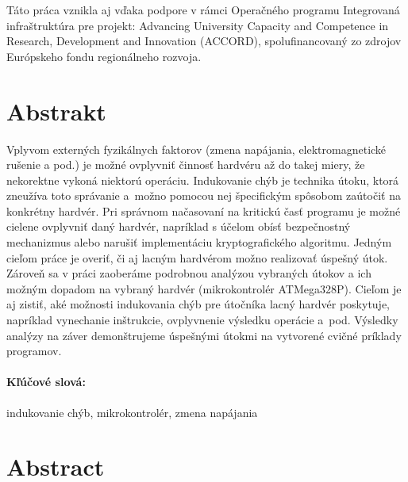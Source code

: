 \documentclass[12pt, twoside]{book}
\begin{document}
Táto práca vznikla aj vďaka podpore v rámci Operačného programu Integrovaná infraštruktúra pre projekt: Advancing University Capacity and Competence in Research, Development and Innovation (ACCORD), spolufinancovaný zo zdrojov Európskeho fondu regionálneho rozvoja.


\newpage 
\section*{Abstrakt}

Vplyvom externých fyzikálnych faktorov (zmena napájania, elektromagnetické rušenie a pod.) je možné ovplyvniť činnosť hardvéru až do takej miery, že nekorektne vykoná niektorú operáciu. Indukovanie chýb je technika útoku, ktorá zneužíva toto správanie a~možno pomocou nej špecifickým spôsobom zaútočiť na konkrétny hardvér. Pri správnom načasovaní na kritickú časť programu je možné cielene ovplyvniť daný hardvér, napríklad s účelom obísť bezpečnostný mechanizmus alebo narušiť implementáciu kryptografického algoritmu. Jedným cieľom práce je overiť, či aj lacným hardvérom možno realizovať úspešný útok. Zároveň sa v práci zaoberáme podrobnou analýzou vybraných útokov a ich možným dopadom na vybraný hardvér (mikrokontrolér ATMega328P). Cieľom je aj zistiť, aké možnosti indukovania chýb pre útočníka lacný hardvér poskytuje, napríklad vynechanie inštrukcie, ovplyvnenie výsledku operácie a~pod. Výsledky analýzy na záver demonštrujeme úspešnými útokmi na vytvorené cvičné príklady programov.

\paragraph*{Kľúčové slová:} indukovanie chýb, mikrokontrolér, zmena napájania


\newpage 
\section*{Abstract}
\end{document}
